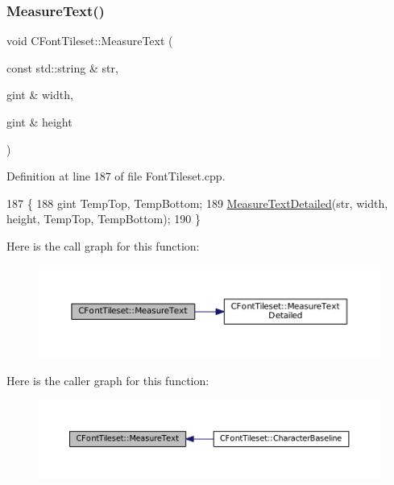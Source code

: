 \subsubsection{\texorpdfstring{Measure\+Text()}{MeasureText()}}
{\footnotesize\ttfamily void C\+Font\+Tileset\+::\+Measure\+Text (\begin{DoxyParamCaption}\item[{const std\+::string \&}]{str,  }\item[{gint \&}]{width,  }\item[{gint \&}]{height }\end{DoxyParamCaption})}



Definition at line 187 of file Font\+Tileset.\+cpp.


\begin{DoxyCode}
187                                                                              \{
188     gint TempTop, TempBottom;
189     \hyperlink{classCFontTileset_a7afa08157a6bea6c0fbd06299685b8b3}{MeasureTextDetailed}(str, width, height, TempTop, TempBottom);
190 \}
\end{DoxyCode}
Here is the call graph for this function\+:
\nopagebreak
\begin{figure}[H]
\begin{center}
\leavevmode
\includegraphics[width=350pt]{classCFontTileset_ad6902d89c94a309fb487d4dbdec97a15_cgraph}
\end{center}
\end{figure}
Here is the caller graph for this function\+:
\nopagebreak
\begin{figure}[H]
\begin{center}
\leavevmode
\includegraphics[width=350pt]{classCFontTileset_ad6902d89c94a309fb487d4dbdec97a15_icgraph}
\end{center}
\end{figure}
\hypertarget{classCFontTileset_a7afa08157a6bea6c0fbd06299685b8b3}{}\label{classCFontTileset_a7afa08157a6bea6c0fbd06299685b8b3} 
